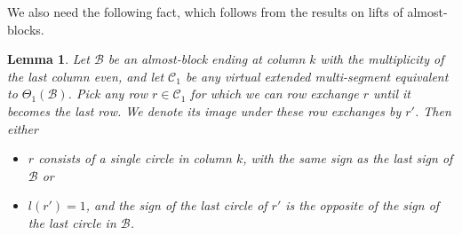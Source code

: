 \documentclass[11pt,letterpaper]{amsart}
\newcommand{\BB}{\mathcal{B}}
\newcommand{\CC}{\mathcal{C}}
\newtheorem{lemma}[thm]{Lemma}
\numberwithin{equation}{section}
\begin{document}
We also need the following fact, which follows from the results on lifts of almost-blocks.
\begin{lemma}
\label{lem-aj-almost-block}
    Let $\BB$ be an almost-block ending at column $k$ with the multiplicity of the last column even, and let $\CC_1$ be any virtual extended multi-segment equivalent to $\Theta_1(\BB)$. Pick any row $r\in\CC_1$ for which we can row exchange $r$ until it becomes the last row. We denote its image under these row exchanges by $r'$. Then either
    \begin{itemize}
        \item $r$ consists of a single circle in column $k$, with the same sign as the last sign of $\BB$ or
        \item $l(r') = 1$, and the sign of the last circle of $r'$ is the opposite of the sign of the last circle in $\BB$.
    \end{itemize}
\end{lemma}
\end{document}
